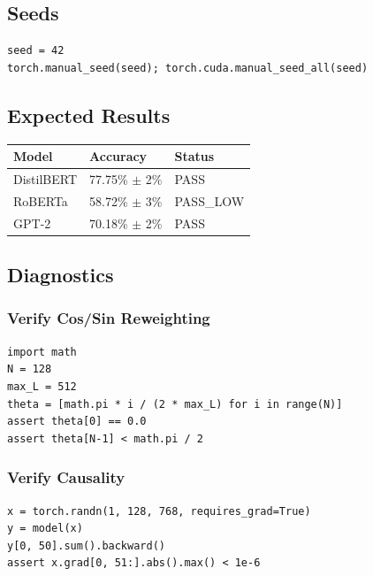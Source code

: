 \subsection{Seeds}

\begin{lstlisting}
seed = 42
torch.manual_seed(seed); torch.cuda.manual_seed_all(seed)
\end{lstlisting}

\subsection{Expected Results}

\begin{table}[H]
\centering
\small
\begin{tabular}{lll}
\toprule
\textbf{Model} & \textbf{Accuracy} & \textbf{Status} \\
\midrule
DistilBERT & 77.75\% $\pm$ 2\% & PASS \\
RoBERTa & 58.72\% $\pm$ 3\% & PASS\_LOW \\
GPT-2 & 70.18\% $\pm$ 2\% & PASS \\
\bottomrule
\end{tabular}
\end{table}

\subsection{Diagnostics}

\subsubsection{Verify Cos/Sin Reweighting}

\begin{lstlisting}
import math
N = 128
max_L = 512
theta = [math.pi * i / (2 * max_L) for i in range(N)]
assert theta[0] == 0.0
assert theta[N-1] < math.pi / 2
\end{lstlisting}

\subsubsection{Verify Causality}

\begin{lstlisting}
x = torch.randn(1, 128, 768, requires_grad=True)
y = model(x)
y[0, 50].sum().backward()
assert x.grad[0, 51:].abs().max() < 1e-6
\end{lstlisting}


